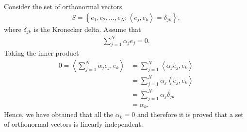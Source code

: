 \begin{questions}

\begin{solution}
Consider the set of orthonormal vectors
\begin{align*}
S=\left\lbrace e_1,e_2,...,e_N;\left<e_j,e_k\right>=\delta_{jk}\right\rbrace,
\end{align*}
where $\delta_{jk}$ is the Kronecker delta. Assume that 
\begin{align*}
\sum_{j=1}^{N}\alpha_je_j=0.
\end{align*}
Taking the inner product
\begin{align*}
0=\left<\sum_{j=1}^{N}\alpha_je_j,e_k\right>&=\sum_{j=1}^{N}\left<\alpha_je_j,e_k\right>\\
&=\sum_{j=1}^{N}\alpha_j\left<e_j,e_k\right>\\
&=\sum_{j=1}^{N}\alpha_j\delta_{jk}\\
&=\alpha_k.
\end{align*}
Hence, we have obtained that all the $\alpha_k=0$ and therefore it is proved that a set of orthonormal vectors is linearly independent.
\end{solution}
\end{questions}
